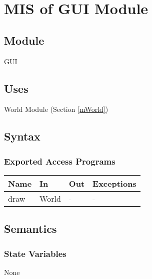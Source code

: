 \documentclass[12pt, titlepage]{article}
\begin{document}
\newpage

\section{MIS of GUI Module} \label{mGUI} 



\subsection{Module}

GUI

\subsection{Uses}
World Module (Section \ref{mWorld})

\subsection{Syntax}


\subsubsection{Exported Access Programs}

\begin{center}
\begin{tabular}{p{2cm} p{4cm} p{4cm} p{2cm}}
\hline
\textbf{Name} & \textbf{In} & \textbf{Out} & \textbf{Exceptions} \\
\hline
draw & World & - & - \\
\hline
\end{tabular}
\end{center}

\subsection{Semantics}

\subsubsection{State Variables}
None
\end{document}
